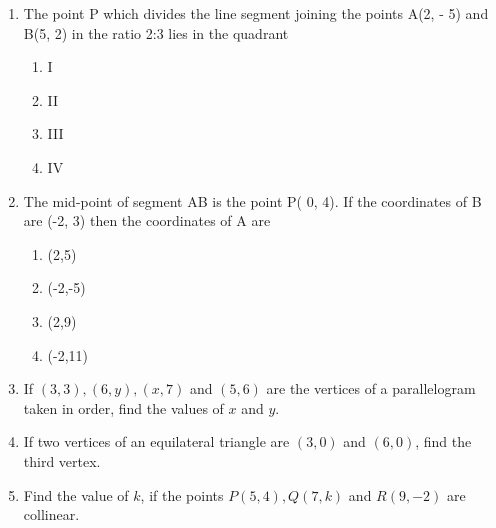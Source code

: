 
\begin{enumerate}
    \item The point P which divides the line segment joining the points A(2, - 5) and B(5, 2) in the ratio 2:3 lies in the quadrant
    \begin{enumerate}
        \item I
        \item II 
        \item III
        \item IV
    \end{enumerate}
    \item The mid-point of segment AB is the point P( 0, 4). If the coordinates of B are (-2, 3) then the coordinates of A are
    \begin{enumerate}
        \item (2,5)
        \item (-2,-5)
        \item (2,9)
        \item (-2,11)
    \end{enumerate}
    \item If $(3,3),(6,y),(x,7)$ and $(5,6)$ are the vertices of a parallelogram taken in order, find the values of $x$ and $y$.
    \item If two vertices of an equilateral triangle are $(3,0)$ and $(6,0)$, find the third vertex.   
    \item Find the value of $k$, if the points $P(5,4),Q(7,k)$ and $R(9,-2)$ are collinear.
\end{enumerate}
